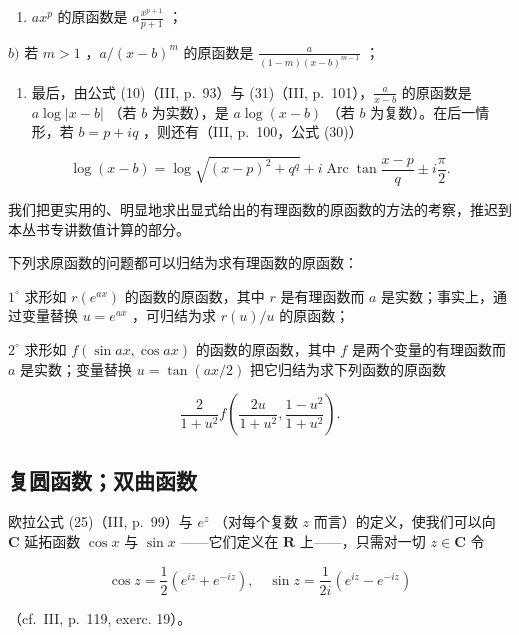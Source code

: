 \begin{enumerate}
\def\labelenumi{\alph{enumi})}
\tightlist
\item
  \(ax^p\) 的原函数是 \(a\frac{x^{p + 1}}{p + 1}\) ；
\end{enumerate}

\(b)\) 若 \(m > 1\) ，\(a / (x - b)^{m}\) 的原函数是 \(\frac{a}{(1 - m)(x - b)^{m - 1}}\) ；

\begin{enumerate}
\def\labelenumi{\alph{enumi})}
\setcounter{enumi}{2}
\tightlist
\item
  最后，由公式 (10)（III, p.~93）与 (31)（III, p.~101），\(\frac{a}{x - b}\) 的原函数是 \(a\log |x - b|\) （若 \(b\) 为实数），是 \(a\log (x - b)\) （若 \(b\) 为复数）。在后一情形，若 \(b = p + iq\) ，则还有（III, p.~100，公式 (30)）
\end{enumerate}

\[
\log (x - b) = \log \sqrt {(x - p) ^ {2} + q ^ {q}} + i \operatorname{Arc} \tan \frac {x - p}{q} \pm i \frac {\pi}{2}.
\]

我们把更实用的、明显地求出显式给出的有理函数的原函数的方法的考察，推迟到本丛书专讲数值计算的部分。

下列求原函数的问题都可以归结为求有理函数的原函数：

\(1^{\circ}\) 求形如 \(r(e^{ax})\) 的函数的原函数，其中 \(r\) 是有理函数而 \(a\) 是实数；事实上，通过变量替换 \(u = e^{ax}\) ，可归结为求 \(r(u) / u\) 的原函数；

\(2^{\circ}\) 求形如 \(f(\sin ax, \cos ax)\) 的函数的原函数，其中 \(f\) 是两个变量的有理函数而 \(a\) 是实数；变量替换 \(u = \tan(ax/2)\) 把它归结为求下列函数的原函数

\[
{\frac {2}{1 + u ^ {2}}} f \left({\frac {2 u}{1 + u ^ {2}}}, {\frac {1 - u ^ {2}}{1 + u ^ {2}}}\right).
\]

\subsection{复圆函数；双曲函数}

欧拉公式 (25)（III, p.~99）与 \(e^z\) （对每个复数 \(z\) 而言）的定义，使我们可以向 \(\mathbf{C}\) 延拓函数 \(\cos x\) 与 \(\sin x\) ——它们定义在 \(\mathbf{R}\) 上——，只需对一切 \(z \in \mathbf{C}\) 令

\[
\cos z = \frac {1}{2} \left(e ^ {i z} + e ^ {- i z}\right), \quad \sin z = \frac {1}{2 i} \left(e ^ {i z} - e ^ {- i z}\right)\tag{32}
\]

（cf.~III, p.~119, exerc. 19）。


